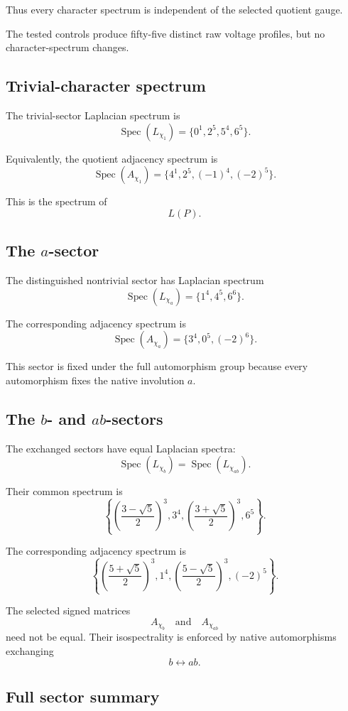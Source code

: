 Thus every character spectrum is independent of the selected quotient
gauge.

The tested controls produce fifty-five distinct raw voltage profiles,
but no character-spectrum changes.

\subsection{Trivial-character spectrum}

The trivial-sector Laplacian spectrum is
\[
\operatorname{Spec}(L_{\chi_1})
=
\{0^1,2^5,5^4,6^5\}.
\]

Equivalently, the quotient adjacency spectrum is
\[
\operatorname{Spec}(A_{\chi_1})
=
\{4^1,2^5,(-1)^4,(-2)^5\}.
\]

This is the spectrum of
\[
L(P).
\]

\subsection{The \(a\)-sector}

The distinguished nontrivial sector has Laplacian spectrum
\[
\operatorname{Spec}(L_{\chi_a})
=
\{1^4,4^5,6^6\}.
\]

The corresponding adjacency spectrum is
\[
\operatorname{Spec}(A_{\chi_a})
=
\{3^4,0^5,(-2)^6\}.
\]

This sector is fixed under the full automorphism group because every
automorphism fixes the native involution \(a\).

\subsection{The \(b\)- and \(ab\)-sectors}

The exchanged sectors have equal Laplacian spectra:
\[
\operatorname{Spec}(L_{\chi_b})
=
\operatorname{Spec}(L_{\chi_{ab}}).
\]

Their common spectrum is
\[
\left\{
\left(\frac{3-\sqrt5}{2}\right)^3,
3^4,
\left(\frac{3+\sqrt5}{2}\right)^3,
6^5
\right\}.
\]

The corresponding adjacency spectrum is
\[
\left\{
\left(\frac{5+\sqrt5}{2}\right)^3,
1^4,
\left(\frac{5-\sqrt5}{2}\right)^3,
(-2)^5
\right\}.
\]

The selected signed matrices
\[
A_{\chi_b}
\quad\text{and}\quad
A_{\chi_{ab}}
\]
need not be equal. Their isospectrality is enforced by native
automorphisms exchanging
\[
b\longleftrightarrow ab.
\]

\subsection{Full sector summary}


